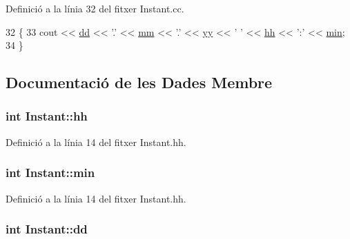 Definició a la línia 32 del fitxer Instant.\-cc.


\begin{DoxyCode}
32                             \{
33     cout << \hyperlink{class_instant_acc6e1db1f2f2f12a87a865d6849f1b2b}{dd} << \textcolor{charliteral}{'.'} << \hyperlink{class_instant_a2912b4df6ae47c81da8f5e041ddc2266}{mm} << \textcolor{charliteral}{'.'} << \hyperlink{class_instant_a67fe547756040a8d5d9088c9827bedba}{yy} << \textcolor{charliteral}{' '} << \hyperlink{class_instant_a56ada80c1afff9825a0003f7253795d1}{hh} << \textcolor{charliteral}{':'} << \hyperlink{class_instant_a4de33b0ded8540ec7a903ab5763eccca}{min};
34 \}\end{DoxyCode}


\subsection{Documentació de les Dades Membre}
\hypertarget{class_instant_a56ada80c1afff9825a0003f7253795d1}{
\subsubsection[{hh}]{\setlength{\rightskip}{0pt plus 5cm}int Instant\-::hh\hspace{0.3cm}{\ttfamily [private]}}}\label{class_instant_a56ada80c1afff9825a0003f7253795d1}


Definició a la línia 14 del fitxer Instant.\-hh.

\hypertarget{class_instant_a4de33b0ded8540ec7a903ab5763eccca}{
\subsubsection[{min}]{\setlength{\rightskip}{0pt plus 5cm}int Instant\-::min\hspace{0.3cm}{\ttfamily [private]}}}\label{class_instant_a4de33b0ded8540ec7a903ab5763eccca}


Definició a la línia 14 del fitxer Instant.\-hh.

\hypertarget{class_instant_acc6e1db1f2f2f12a87a865d6849f1b2b}{
\subsubsection[{dd}]{\setlength{\rightskip}{0pt plus 5cm}int Instant\-::dd\hspace{0.3cm}{\ttfamily [private]}}}\label{class_instant_acc6e1db1f2f2f12a87a865d6849f1b2b}


